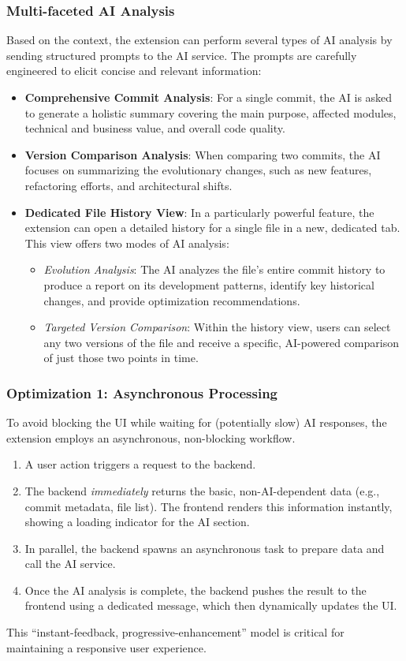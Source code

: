 \subsubsection{Multi-faceted AI Analysis}
Based on the context, the extension can perform several types of AI analysis by sending structured prompts to the AI service. The prompts are carefully engineered to elicit concise and relevant information:
\begin{itemize}
    \item \textbf{Comprehensive Commit Analysis}: For a single commit, the AI is asked to generate a holistic summary covering the main purpose, affected modules, technical and business value, and overall code quality.
    \item \textbf{Version Comparison Analysis}: When comparing two commits, the AI focuses on summarizing the evolutionary changes, such as new features, refactoring efforts, and architectural shifts.
    \item \textbf{Dedicated File History View}: In a particularly powerful feature, the extension can open a detailed history for a single file in a new, dedicated tab. This view offers two modes of AI analysis:
    \begin{itemize}
        \item \textit{Evolution Analysis}: The AI analyzes the file's entire commit history to produce a report on its development patterns, identify key historical changes, and provide optimization recommendations.
        \item \textit{Targeted Version Comparison}: Within the history view, users can select any two versions of the file and receive a specific, AI-powered comparison of just those two points in time.
    \end{itemize}
\end{itemize}

\subsubsection{Optimization 1: Asynchronous Processing}
To avoid blocking the UI while waiting for (potentially slow) AI responses, the extension employs an asynchronous, non-blocking workflow.
\begin{enumerate}
    \item A user action triggers a request to the backend.
    \item The backend \textit{immediately} returns the basic, non-AI-dependent data (e.g., commit metadata, file list). The frontend renders this information instantly, showing a loading indicator for the AI section.
    \item In parallel, the backend spawns an asynchronous task to prepare data and call the AI service.
    \item Once the AI analysis is complete, the backend pushes the result to the frontend using a dedicated message, which then dynamically updates the UI.
\end{enumerate}
This ``instant-feedback, progressive-enhancement'' model is critical for maintaining a responsive user experience.

